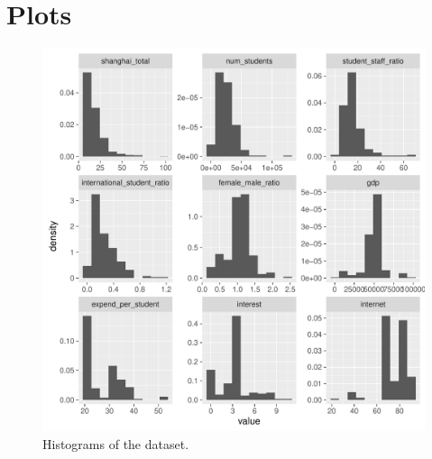 \documentclass{stats_apa_style2}
\begin{document}
\newpage




\newpage
\appendix

\section{Plots}
\label{app: A}

\begin{figure}[H]
	\includegraphics[width=\textwidth]{graphs/histograms}
	\caption{Histograms of the dataset.}
	\label{fig:hist}
\end{figure}
\end{document}
